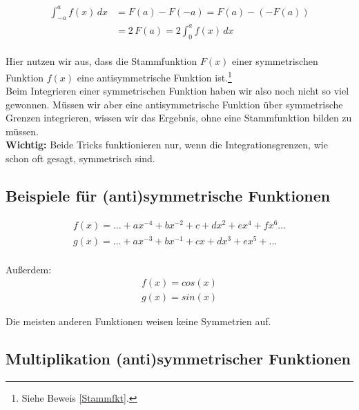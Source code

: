 \begin{align}
\int_{-a}^a f(x) \, dx &= F(a) - F(-a) = F(a) -(-F(a))\\
&= 2\,F(a) = 2 \int_{0}^a f(x) \, dx
\end{align}\\
Hier nutzen wir aus, dass die Stammfunktion $F(x)$ einer symmetrischen Funktion $f(x)$ eine antisymmetrische Funktion ist.\footnote{Siehe Beweis \ref{Stammfkt}.}\\
Beim Integrieren einer symmetrischen Funktion haben wir also noch nicht so viel gewonnen. Müssen wir aber eine antisymmetrische Funktion über symmetrische Grenzen integrieren, wissen wir das Ergebnis, ohne eine Stammfunktion bilden zu müssen.\\
\textbf{Wichtig:} Beide Tricks funktionieren nur, wenn die Integrationsgrenzen, wie schon oft gesagt,  symmetrisch sind.

\subsection{Beispiele für (anti)symmetrische Funktionen}

 \begin{align*}
 f(x) = \dots + ax^{-4} + bx^{-2} + c + dx^{2} + ex^{4} + fx^{6}\dots\\
 g(x) = \dots + ax^{-3} + bx^{-1} + cx + dx^{3} + ex^{5}+\dots
 \end{align*}\\
 Außerdem:
 \begin{align*}
 f(x) = cos(x)\\
 g(x) = sin(x)
 \end{align*}
 
 Die meisten anderen Funktionen weisen keine Symmetrien auf.
 
 \subsection{Multiplikation (anti)symmetrischer Funktionen}
 

